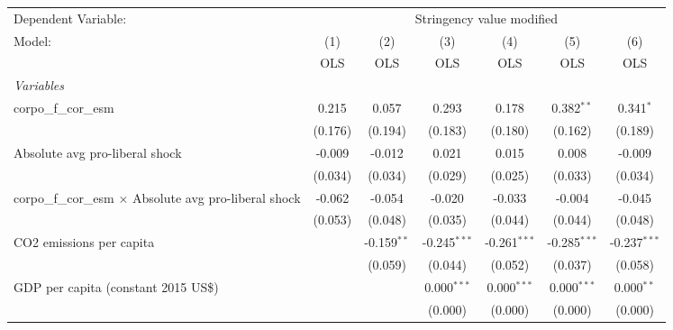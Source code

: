 
\begingroup
\centering
\begin{tabular}{lcccccc}
   \toprule
   Dependent Variable: & \multicolumn{6}{c}{Stringency value modified}\\
   Model:                                                         & (1)     & (2)           & (3)            & (4)            & (5)            & (6)\\  
                                                                  &  OLS    & OLS           & OLS            & OLS            & OLS            & OLS\\  
   \midrule
   \emph{Variables}\\
   corpo\_f\_cor\_esm                                             & 0.215   & 0.057         & 0.293          & 0.178          & 0.382$^{**}$   & 0.341$^{*}$\\   
                                                                  & (0.176) & (0.194)       & (0.183)        & (0.180)        & (0.162)        & (0.189)\\   
   Absolute avg pro-liberal shock                                 & -0.009  & -0.012        & 0.021          & 0.015          & 0.008          & -0.009\\   
                                                                  & (0.034) & (0.034)       & (0.029)        & (0.025)        & (0.033)        & (0.034)\\   
   corpo\_f\_cor\_esm $\times$ Absolute avg pro-liberal shock     & -0.062  & -0.054        & -0.020         & -0.033         & -0.004         & -0.045\\   
                                                                  & (0.053) & (0.048)       & (0.035)        & (0.044)        & (0.044)        & (0.048)\\   
   CO2 emissions per capita                                       &         & -0.159$^{**}$ & -0.245$^{***}$ & -0.261$^{***}$ & -0.285$^{***}$ & -0.237$^{***}$\\   
                                                                  &         & (0.059)       & (0.044)        & (0.052)        & (0.037)        & (0.058)\\   
   GDP per capita (constant 2015 US\$)                            &         &               & 0.000$^{***}$  & 0.000$^{***}$  & 0.000$^{***}$  & 0.000$^{**}$\\   
                                                                  &         &               & (0.000)        & (0.000)        & (0.000)        & (0.000)\\   

\end{tabular}

